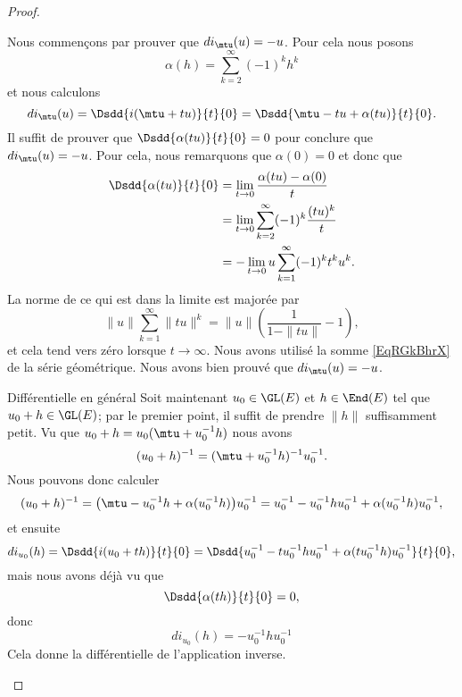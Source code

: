 \begin{proof}
\begin{subproof}
    Nous commençons par prouver que \( di_{\mtu}(u)=-u\). Pour cela nous posons 
    \begin{equation}
        \alpha(h)=\sum_{k=2}^{\infty}(-1)^kh^k
    \end{equation}
    et nous calculons
    \begin{equation}
    di_{\mtu}(u)=\Dsdd{ i(\mtu+tu) }{t}{0}=\Dsdd{ \mtu-tu+\alpha(tu) }{t}{0}.
    \end{equation}
    Il suffit de prouver que \( \Dsdd{ \alpha(tu) }{t}{0}=0\) pour conclure que \( di_{\mtu}(u)=-u\). Pour cela, nous remarquons que \( \alpha(0)=0\) et donc que
    \begin{subequations}
        \begin{align}
        \Dsdd{ \alpha(tu) }{t}{0}&=\lim_{t\to 0} \frac{ \alpha(tu)-\alpha(0) }{ t }\\
        &=\lim_{t\to 0} \sum_{k=2}^{\infty}(-1)^k\frac{ (tu)^k }{ t }\\
        &=-\lim_{t\to 0} u\sum_{k=1}^{\infty}(-1)^kt^ku^k.
        \end{align}
    \end{subequations}
    La norme de ce qui est dans la limite est majorée par
    \begin{equation}
    \| u \|\sum_{k=1}^{\infty}\| tu \|^k=\| u \|\left( \frac{1}{ 1-\| tu \| }-1 \right),
    \end{equation}
    et cela tend vers zéro lorsque \( t\to\infty\). Nous avons utilisé la somme \ref{EqRGkBhrX} de la série géométrique. Nous avons bien prouvé que \( di_{\mtu}(u)=-u\).

    \item[Différentielle en général]
    Soit maintenant \( u_0\in\GL(E)\) et \( h\in\End(E)\) tel que \( u_0+h\in \GL(E)\); par le premier point, il suffit de prendre \( \| h \|\) suffisamment petit. Vu que \( u_0+h=u_0(\mtu+u_0^{-1}h)\) nous avons
    \begin{equation}
        (u_0+h)^{-1}=(\mtu+u_0^{-1}h)^{-1}u_0^{-1}.
    \end{equation}
    Nous pouvons donc calculer
    \begin{equation}
        (u_0+h)^{-1}=\big( \mtu-u_0^{-1}h+\alpha(u_0^{-1}h) \big)u_0^{-1}=u_0^{-1}-u_0^{-1}hu_0^{-1}+\alpha(u_0^{-1}h)u_0^{-1},
    \end{equation}
    et ensuite
    \begin{equation}
        di_{u_0}(h)=\Dsdd{ i(u_0+th) }{t}{0}=\Dsdd{ u_0^{-1}-tu_0^{-1}hu_0^{-1}+\alpha(tu_0^{-1}h)u_0^{-1} }{t}{0},
    \end{equation}
    mais nous avons déjà vu que
    \begin{equation}
        \Dsdd{ \alpha(th) }{t}{0}=0,
    \end{equation}
    donc
    \begin{equation}
        di_{u_0}(h)=-u_0^{-1}hu_0^{-1}
    \end{equation}
    Cela donne la différentielle de l'application inverse.


\end{subproof}
\end{proof}
